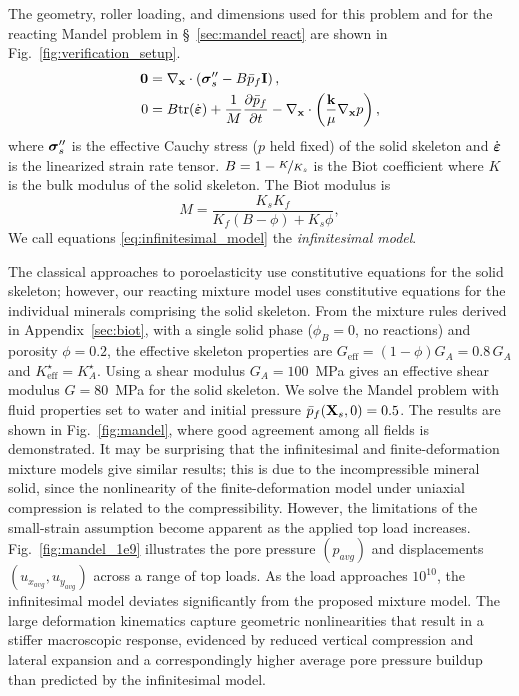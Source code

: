 \documentclass[11pt]{article}
\begin{document}
The geometry, roller loading, and dimensions used for this problem and for the reacting Mandel problem in \S~\ref{sec:mandel react} are shown in Fig.~\ref{fig:verification_setup}.
%
\begin{subequations}
\begin{align}
  \mathbf{0} &= \nabla_{\mathbf{x}} \cdot \left(\boldsymbol{\sigma}^{\prime\prime}_s - B \bar{p}_f \mathbf{I}\right), \label{eq:infa} \\
  0 &= B \mbox{tr}(\dot{\boldsymbol{\varepsilon}}) + \frac{1}{M} \frac{\partial \bar{p}_f}{\partial t} - \nabla_{\mathbf{x}} \cdot \left(\frac{\mathbf{k}}{\mu}\nabla_{\mathbf{x}} p\right), \label{eq:infb}
\end{align}
  \label{eq:infinitesimal_model}
\end{subequations}
%
where $\boldsymbol{\sigma}^{\prime\prime}_s$ is the effective Cauchy stress ($p$ held fixed) of the solid skeleton and $\dot{\boldsymbol{\varepsilon}}$ is the linearized strain rate tensor. $B = 1 - \nicefrac{K}{K_s}$ is the Biot coefficient where $K$ is the bulk modulus of the solid skeleton. The Biot modulus is
%
\begin{equation*}
M = \frac{K_s K_f}{K_f (B - \phi) + K_s \phi},
\end{equation*}
%
We call equations \eqref{eq:infinitesimal_model} the \emph{infinitesimal model}.

The classical approaches to poroelasticity use constitutive equations for the solid skeleton; however, our reacting mixture model uses constitutive equations for the individual minerals comprising the solid skeleton.  From the mixture rules derived in Appendix~\ref{sec:biot}, with a single solid phase ($\phi_B = 0$, no reactions) and porosity $\phi = 0.2$, the effective skeleton properties are $G_{\text{eff}} = (1-\phi) G_A = 0.8\, G_A$ and $K^\star_{\text{eff}} = K^\star_A$.  Using a shear modulus $G_A = 100$~MPa gives an effective shear modulus $G = 80$~MPa for the solid skeleton. We solve the Mandel problem with fluid properties set to water and initial pressure $\bar{p}_f(\mathbf{X}_s, 0) = 0.5$.  The results are shown in Fig.~\ref{fig:mandel}, where good agreement among all fields is demonstrated.  It may be surprising that the infinitesimal and finite-deformation mixture models give similar results; this is due to the incompressible mineral solid, since the nonlinearity of the finite-deformation model under uniaxial compression is related to the compressibility. However, the limitations of the small-strain assumption become apparent as the applied top load increases. Fig.~\ref{fig:mandel_1e9} illustrates the pore pressure $(p_{avg})$ and displacements $(u_{x_{avg}}, u_{y_{avg}})$ across a range of top loads. As the load approaches $10^{10}$, the infinitesimal model deviates significantly from the proposed mixture model. The large deformation kinematics capture geometric nonlinearities that result in a stiffer macroscopic response, evidenced by reduced vertical compression and lateral expansion and a correspondingly higher average pore pressure buildup than predicted by the infinitesimal model.
\end{document}
